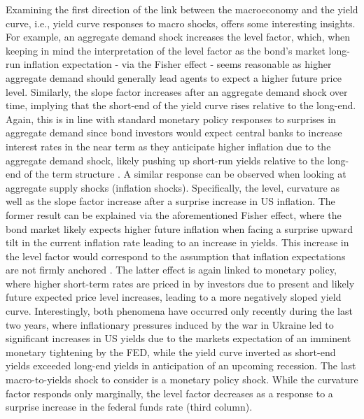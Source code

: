 Examining the first direction of the link between the macroeconomy and the yield curve, i.e., yield curve responses to macro shocks, offers some interesting insights. 
For example, an aggregate demand shock increases the level factor, which, when keeping in mind the interpretation 
of the level factor as the bond's market long-run inflation expectation - via the Fisher effect - seems reasonable as higher aggregate demand should generally lead agents to expect a higher future price level.
Similarly, the slope factor increases after an aggregate demand shock over time, implying that the short-end of the yield curve rises relative to the long-end. 
Again, this is in line with standard monetary policy responses to surprises in aggregate demand since bond investors would expect central banks to increase interest rates in the near term as they anticipate higher inflation due to the aggregate demand shock, likely pushing up short-run yields relative to the long-end of the term structure \citep{diebold2006macroeconomy}.
A similar response can be observed when looking at aggregate supply shocks (inflation shocks).
Specifically, the level, curvature as well as the slope factor increase after a surprise increase in US inflation. 
The former result can be explained via the aforementioned Fisher effect, where the bond market likely expects higher future inflation when facing a surprise upward tilt in the current inflation rate leading to an increase in yields. 
This increase in the level factor would correspond to the assumption that inflation expectations are not firmly anchored \citep{diebold2006macroeconomy}. 
The latter effect is again linked to monetary policy, where higher short-term rates are priced in by investors due to present and likely future expected price level increases, leading to a more negatively sloped yield curve. 
Interestingly, both phenomena have occurred only recently during the last two years, where inflationary pressures induced by the war in Ukraine led to significant increases in US yields due to the markets expectation of an imminent monetary tightening by the FED, while the yield curve inverted as short-end yields exceeded long-end yields in anticipation of an upcoming recession. 
The last macro-to-yields shock to consider is a monetary policy shock. 
While the curvature factor responds only marginally, the level factor decreases as a response to a surprise increase in the federal funds rate (third column). 
